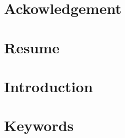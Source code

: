 

\section*{Ackowledgement}\label{thk}


\clearpage

\section*{Resume}


\clearpage
\section*{Introduction}

\section*{Keywords}



